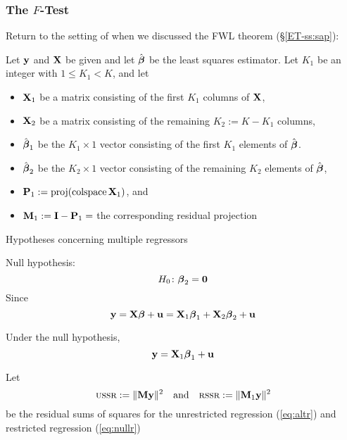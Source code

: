 \begin{frame}\frametitle{The $F$-Test}

    \vspace{2em}
    Return to the setting of when we discussed the FWL theorem (\S\ref{ET-ss:sap}):
    
    Let ${\mathbf y}$ and $\mathbf X$ be given and let $\hat {\boldsymbol \beta}$ be the least squares estimator. Let $K_1$ be an integer with $1 \leq
    K_1 < K$, and let
    \begin{itemize}
        \item $\mathbf X_1$ be a matrix consisting of the first $K_1$ columns of
            $\mathbf X$,
        \item $\mathbf X_2$ be a matrix consisting of the remaining $K_2 := K - K_1$
            columns,
        \item $\hat {\boldsymbol \beta}_1$ be the $K_1 \times 1$ vector consisting of the first
            $K_1$ elements of $\hat {\boldsymbol \beta}$.
        \item $\hat {\boldsymbol \beta}_2$ be the $K_2 \times 1$ vector consisting of the
            remaining $K_2$ elements of $\hat {\boldsymbol \beta}$,
        \item $\mathbf P_1 := \operatorname{proj} ( \operatorname{colspace} \mathbf X_1)$, and
        \item $\mathbf M_1 := \mathbf I - \mathbf P_1 =$ the corresponding residual
            projection
    \end{itemize}
    
\end{frame}


\begin{frame}

    \vspace{2em}
    Hypotheses concerning multiple regressors
    
    Null hypothesis:
    \begin{equation*}
        H_0 \colon {\boldsymbol \beta}_2 = {\mathbf 0}
    \end{equation*}
    Since
    \begin{equation}
        \label{eq:altr}
        {\mathbf y} 
        = \mathbf X {\boldsymbol \beta} + {\mathbf u} 
        = \mathbf X_1 {\boldsymbol \beta}_1 + \mathbf X_2 {\boldsymbol \beta}_2 + {\mathbf u}
    \end{equation}
    
    \vspace{.7em}
    Under the null hypothesis,
    \begin{equation}
        \label{eq:nullr}
        {\mathbf y} = \mathbf X_1 {\boldsymbol \beta}_1 + {\mathbf u}
    \end{equation}

    Let
    \begin{equation*}
        \textrm{{\sc ussr}} := \| \mathbf M {\mathbf y} \|^2
        \quad \text{and} \quad
        \textrm{{\sc rssr}} := \| \mathbf M_1 {\mathbf y} \|^2
    \end{equation*}
    be the residual sums of squares for the unrestricted regression
    (\ref{eq:altr}) and restricted regression (\ref{eq:nullr})
    
\end{frame}

